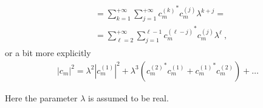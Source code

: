 \documentclass[letterpaper,10pt,english]{jupyterBook}
\begin{document}
\begin{itemize}
\begin{equation*}
\begin{split}
\begin{aligned}
     & = \sum_{k=1}^{+\infty} \sum_{j=1}^{+\infty} {c_m^{(k)}}^* c_m^{(j)} \lambda^{k+j} = \\
     & = \sum_{\ell=2}^{+\infty} \sum_{j=1}^{\ell-1} {c_m^{(\ell-j)}}^* c_m^{(j)} \lambda^{\ell} \ ,
   \end{aligned}\end{split}
\end{equation*}
\sphinxAtStartPar
or a bit more explicitly
\begin{equation*}
\begin{split}| c_m |^2 = \lambda^2 |c_m^{(1)}|^2 + \lambda^3 \left( {c_m^{(2)}}^* c_m^{(1)} + {c_m^{(1)}}^* c_m^{(2)} \right) + \dots\end{split}
\end{equation*}
\end{itemize}

\sphinxAtStartPar
Here the parameter \(\lambda\) is assumed to be real.
\end{document}
